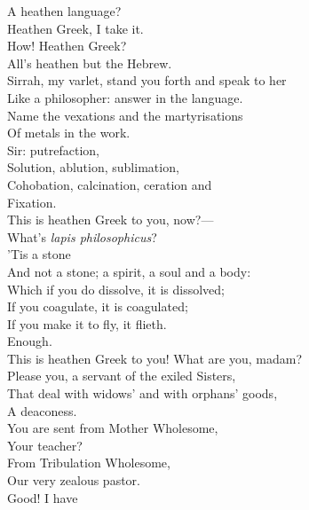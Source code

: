 \documentclass[a4paper,oneside,12pt]{memoir}
\begin{document}
\begin{drama*}
\subtlespeaks A heathen language?\\
\persecutionspeaks {} Heathen Greek, I take it.\\
\subtlespeaks How! Heathen Greek?\\
\persecutionspeaks {} All's heathen but the Hebrew.\\
\subtlespeaks Sirrah, my varlet, stand you forth and speak to her\\
Like a philosopher: answer in the language.\\
Name the vexations and the martyrisations\\
Of metals in the work.\\
\facespeaks {} Sir: putrefaction,\\
Solution, ablution, sublimation,\\
Cohobation, calcination, ceration and\\
Fixation.\\
\subtlespeaks {} This is heathen Greek to you, now?---\\
What's \emph{lapis philosophicus}?\\
\facespeaks {} 'Tis a stone\\
And not a stone; a spirit, a soul and a body:\\
Which if you do dissolve, it is dissolved;\\
If you coagulate, it is coagulated;\\
If you make it to fly, it flieth.\\
\subtlespeaks {} Enough.\\
This is heathen Greek to you! What are you, madam?\\
\persecutionspeaks Please you, a servant of the exiled Sisters,\\
That deal with widows' and with orphans' goods,\\
A deaconess.\\
\subtlespeaks {} You are sent from Mother Wholesome,\\
Your teacher?\\
\persecutionspeaks {} From Tribulation Wholesome,\\
Our very zealous pastor.\\
\subtlespeaks {} Good! I have\\

\end{drama*}
\end{document}

